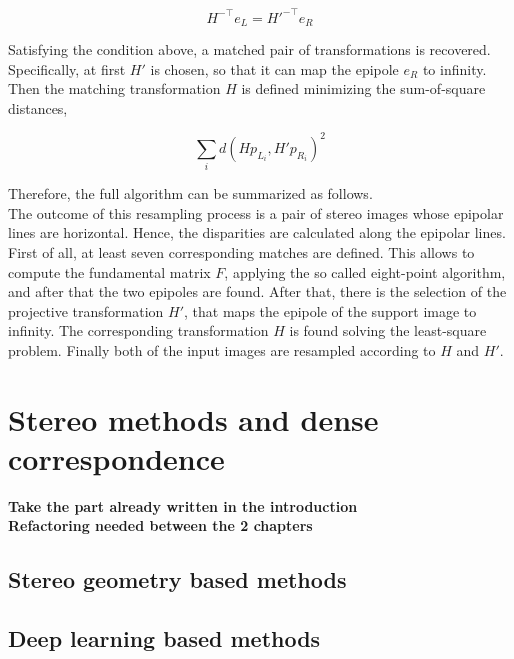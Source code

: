 \begin{equation}
	H^{-\top} e_L = H'^{-\top} e_R
\end{equation}

Satisfying the condition above, a matched pair of transformations is recovered.\\
Specifically, at first $H'$ is chosen, so that it can map the epipole $e_R$ to infinity. 
Then the matching transformation $H$ is defined minimizing the sum-of-square distances,

\begin{equation}\label{eqn:matchtransfconstr}
	\sum_i d(H p_{L_i}, H'p_{R_i})^2
\end{equation}

Therefore, the full algorithm can be summarized as follows.\\
The outcome of this resampling process is a pair of stereo images whose epipolar lines are horizontal.
Hence, the disparities are calculated along the epipolar lines. 
First of all, at least seven corresponding matches are defined.
This allows to compute the fundamental matrix $F$, applying the so called eight-point algorithm, and after that the two epipoles are found.
After that, there is the selection of the projective transformation $H'$, that maps the epipole of the support image to infinity.
The corresponding transformation $H$ is found solving the least-square problem.
Finally both of the input images are resampled according to $H$ and $H'$.

\section{Stereo methods and dense correspondence}
\label{sec:stereometh}

\textbf{Take the part already written in the introduction}\\
\textbf{Refactoring needed between the 2 chapters}

\subsection{Stereo geometry based methods}

\subsection{Deep learning based methods}
\label{subsec:deeplearnmeth}

